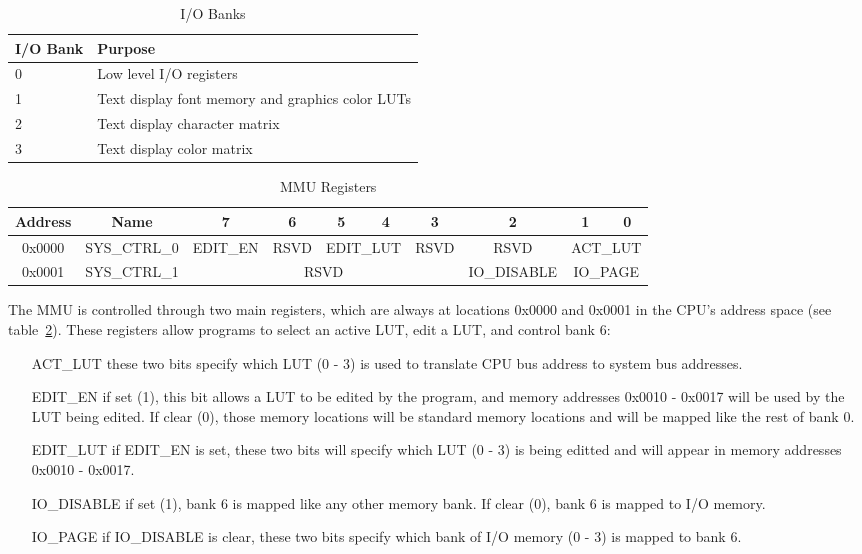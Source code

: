 \documentclass[oneside]{book}
\begin{document}
\begin{table}
	\begin{center}
		\begin{tabular}{| l | l |} \hline
			I/O Bank & Purpose \\ \hline
			0 & Low level I/O registers \\ \hline
			1 & Text display font memory and graphics color LUTs \\ \hline
			2 & Text display character matrix \\ \hline
			3 & Text display color matrix \\ \hline
		\end{tabular}
	\end{center}
	\caption{I/O Banks}
	\label{tab:io_banks}
\end{table}

\begin{table}
	\begin{center}
		\begin{tabular}{| c | c || c | c | c | c | c | c | c | c |} \hline
			Address & Name & 7 & 6 & 5 & 4 & 3 & 2 & 1 & 0 \\ \hline\hline
			0x0000 & SYS\_CTRL\_0 & EDIT\_EN & RSVD & \multicolumn{2}{|c|}{EDIT\_LUT} & RSVD & RSVD & \multicolumn{2}{|c|}{ACT\_LUT} \\ \hline
			0x0001 & SYS\_CTRL\_1 & \multicolumn{5}{|c|}{RSVD} & IO\_DISABLE & \multicolumn{2}{|c|}{IO\_PAGE} \\ \hline
		\end{tabular}
	\end{center}
	\caption{MMU Registers}
	\label{tab:mmu_registers}
\end{table}

The MMU is controlled through two main registers, which are always at locations 0x0000 and 0x0001 in the CPU's address space (see table~\ref{tab:mmu_registers}). These registers allow programs to select an active LUT, edit a LUT, and control bank 6:

\begin{itemize}
	\item[ACT\_LUT] these two bits specify which LUT (0 - 3) is used to translate CPU bus address to system bus addresses.

	\item[EDIT\_EN] if set (1), this bit allows a LUT to be edited by the program, and memory addresses 0x0010 - 0x0017 will be used by the LUT being edited. If clear (0), those memory locations will be standard memory locations and will be mapped like the rest of bank 0.

	\item[EDIT\_LUT] if EDIT\_EN is set, these two bits will specify which LUT (0 - 3) is being editted and will appear in memory addresses 0x0010 - 0x0017.

	\item[IO\_DISABLE] if set (1), bank 6 is mapped like any other memory bank. If clear (0), bank 6 is mapped to I/O memory.

	\item[IO\_PAGE] if IO\_DISABLE is clear, these two bits specify which bank of I/O memory (0 - 3) is mapped to bank 6.
\end{itemize}
\end{document}
